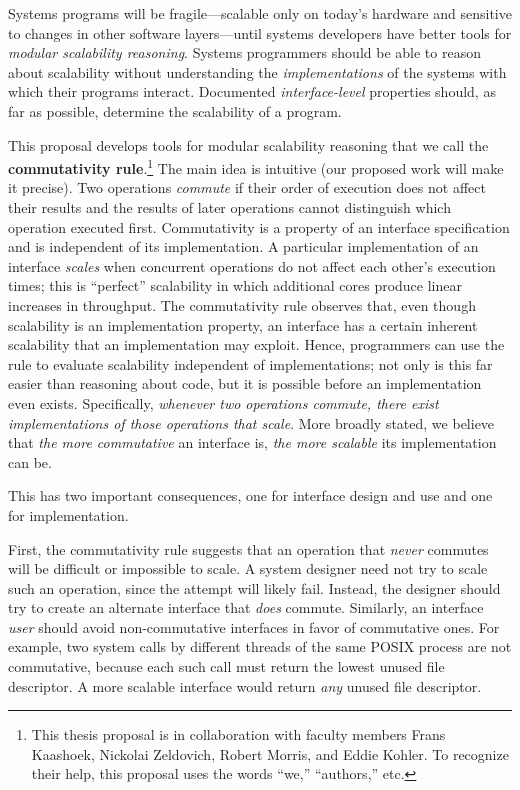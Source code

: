 Systems programs will be fragile---scalable only on today's
hardware and sensitive to changes in other software layers---until
systems developers have better tools for \emph{modular scalability
  reasoning}.
%
Systems programmers should be able to reason about scalability
without understanding the \emph{implementations} of
the systems with which their programs interact.
%
Documented \emph{interface-level} properties should, as far as
possible, determine the scalability of a program.

This proposal develops tools for modular scalability reasoning that we
call the \textbf{commutativity rule}.\footnote{This thesis proposal is
  in collaboration with faculty members Frans Kaashoek, Nickolai
  Zeldovich, Robert Morris, and Eddie Kohler.  To recognize their
  help, this proposal uses the words ``we,'' ``authors,'' etc.}
%
The main idea is intuitive (our proposed work will make it precise).
%
Two operations \emph{commute} if their order of execution does not
affect their results and the results of
later operations cannot distinguish which operation executed first.
%
Commutativity is a property of an interface specification
and is independent of its
implementation.  A particular implementation of an interface
\emph{scales} when concurrent operations do not affect each other's
execution times; this is ``perfect'' scalability in which
additional cores produce linear increases in throughput.
The commutativity rule observes that, even though
scalability is an implementation property, an interface has a certain
inherent scalability that an implementation may exploit.
Hence, programmers can use the rule to evaluate scalability
independent of implementations; not only is this far easier than
reasoning about code, but it is possible before an implementation even
exists.
%
Specifically, \emph{whenever two
operations commute, there exist implementations of those operations that
scale}.
%
More broadly stated, we believe that \emph{the more commutative} an
interface is, \emph{the more scalable} its implementation can be.

This has two important consequences, one for interface design and use
and one for implementation.

First, the commutativity rule suggests that an operation that
\emph{never} commutes will be difficult or impossible to scale.
%
A system designer need not try to scale such an operation, since the
attempt will likely fail.
%
Instead, the designer should try to create an alternate interface that
\emph{does} commute.
%
Similarly, an interface \emph{user} should avoid non-commutative
interfaces in favor of commutative ones.
%
For example, two  system calls by different threads of
the same POSIX process are not commutative, because each such call
must return the lowest unused file descriptor.
%
A more scalable  interface would return \emph{any}
unused file descriptor.

